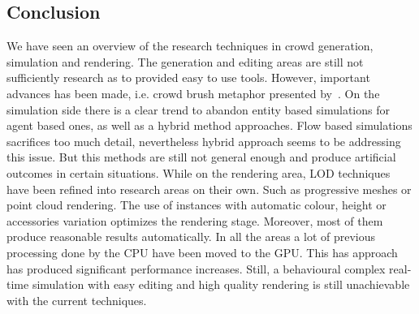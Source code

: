\documentclass[6pt]{article} %
\begin{document}
\begin{multicols}{2}
\section{Conclusion}
We have seen an overview of the research techniques in crowd generation, simulation and rendering.
The generation and editing areas are still not sufficiently research as to provided easy to use tools.
However, important advances has been made, i.e. crowd brush metaphor presented by~\cite{Ulicny2004}.
On the simulation side there is a clear trend to abandon entity based simulations for agent based ones, as well as a hybrid method approaches.
Flow based simulations sacrifices too much detail, nevertheless hybrid approach seems to be addressing this issue.
But this methods are still not general enough and produce artificial outcomes in certain situations.
While on the rendering area, LOD techniques have been refined into research areas on their own.
Such as progressive meshes or point cloud rendering.
The use of instances with automatic colour, height or accessories variation optimizes the rendering stage.
Moreover, most of them produce reasonable results automatically.
In all the areas a lot of previous processing done by the CPU have been moved to the GPU.
This has approach has produced significant performance increases.
Still, a behavioural complex real-time simulation with easy editing and high quality rendering is still unachievable with the current techniques.

\end{multicols}
\end{document}
